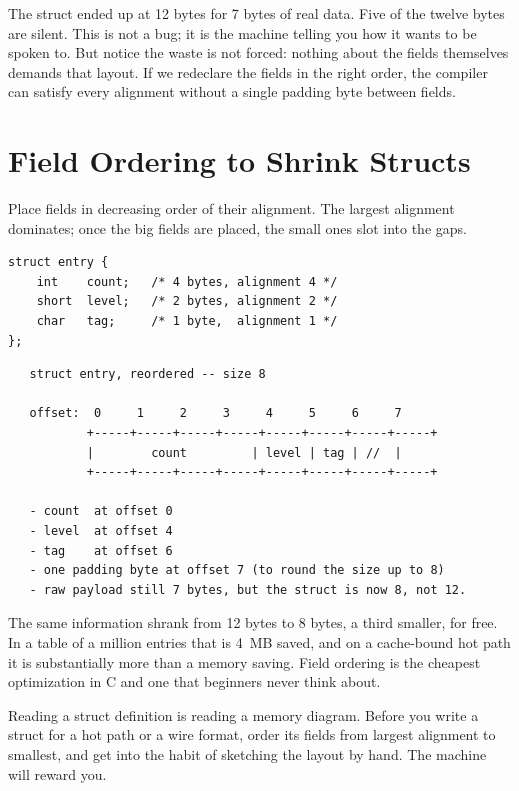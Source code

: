 The struct ended up at 12 bytes for 7 bytes of real data. Five of the
twelve bytes are silent. This is not a bug; it is the machine telling
you how it wants to be spoken to. But notice the waste is not forced:
nothing about the fields themselves demands that layout. If we
redeclare the fields in the right order, the compiler can satisfy every
alignment without a single padding byte between fields.

\section{Field Ordering to Shrink Structs}

Place fields in decreasing order of their alignment. The largest
alignment dominates; once the big fields are placed, the small ones
slot into the gaps.

\begin{lstlisting}[caption={The same data, reordered.}]
struct entry {
    int    count;   /* 4 bytes, alignment 4 */
    short  level;   /* 2 bytes, alignment 2 */
    char   tag;     /* 1 byte,  alignment 1 */
};
\end{lstlisting}

\begin{verbatim}
   struct entry, reordered -- size 8

   offset:  0     1     2     3     4     5     6     7
           +-----+-----+-----+-----+-----+-----+-----+-----+
           |        count         | level | tag | //  |
           +-----+-----+-----+-----+-----+-----+-----+-----+

   - count  at offset 0
   - level  at offset 4
   - tag    at offset 6
   - one padding byte at offset 7 (to round the size up to 8)
   - raw payload still 7 bytes, but the struct is now 8, not 12.
\end{verbatim}

The same information shrank from 12 bytes to 8 bytes, a third smaller,
for free. In a table of a million entries that is 4~MB saved, and on a
cache-bound hot path it is substantially more than a memory saving.
Field ordering is the cheapest optimization in C and one that beginners
never think about.

\begin{insight}
Reading a struct definition is reading a memory diagram. Before you
write a struct for a hot path or a wire format, order its fields from
largest alignment to smallest, and get into the habit of sketching the
layout by hand. The machine will reward you.
\end{insight}

